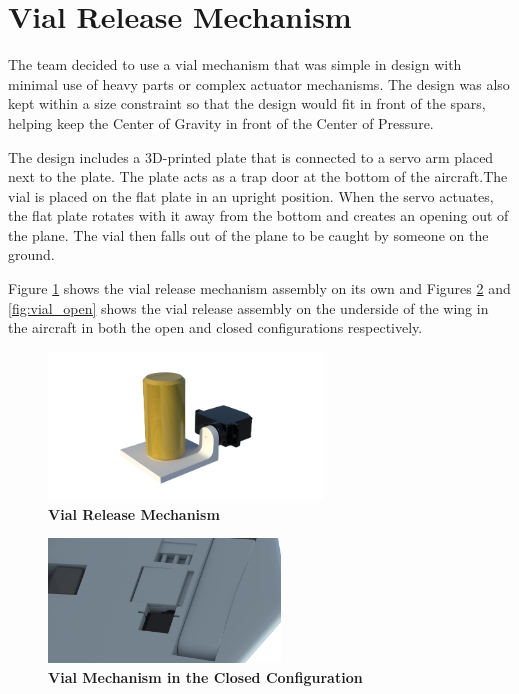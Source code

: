 \section{Vial Release Mechanism}

    The team decided to use a vial mechanism that was simple in design with minimal use of heavy parts or complex actuator mechanisms. The design was also kept within a size constraint so that the design would fit in front of the spars, helping keep the Center of Gravity in front of the Center of Pressure. 
    
    The design includes a 3D-printed plate that is connected to a servo arm placed next to the plate. The plate acts as a trap door at the bottom of the aircraft.The vial is placed on the flat plate in an upright position. When the servo actuates, the flat plate rotates with it away from the bottom and creates an opening out of the plane. The vial then falls out of the plane to be caught by someone on the ground.
    
    Figure \ref{fig:vial_assembly} shows the vial release mechanism assembly on its own and Figures \ref{fig:vial_closed} and \ref{fig:vial_open} shows the vial release assembly on the underside of the wing in the aircraft in both the open and closed configurations respectively.
    
    \begin{figure}[H]
        \centering
        \includegraphics[width=0.65\textwidth]{homeworks/homework4/report/Figure/assembly_vial_door.png}
        \caption{\textbf{Vial Release Mechanism}}
        \label{fig:vial_assembly}
    \end{figure}
            
    \begin{figure}[H]
        \centering
        \includegraphics[width=0.55\textwidth]{homeworks/homework4/report/Figure/aircraft_assembly_door_closed.png}
        \caption{\textbf{Vial Mechanism in the Closed Configuration}}
        \label{fig:vial_closed}
    \end{figure}
    
